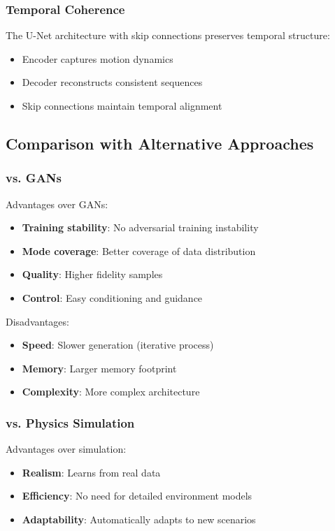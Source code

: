 \documentclass[journal]{IEEEtran}
\begin{document}
\subsubsection{Temporal Coherence}
The U-Net architecture with skip connections preserves temporal structure:
\begin{itemize}
\item Encoder captures motion dynamics
\item Decoder reconstructs consistent sequences
\item Skip connections maintain temporal alignment
\end{itemize}

\subsection{Comparison with Alternative Approaches}

\subsubsection{vs. GANs}
Advantages over GANs:
\begin{itemize}
\item \textbf{Training stability}: No adversarial training instability
\item \textbf{Mode coverage}: Better coverage of data distribution
\item \textbf{Quality}: Higher fidelity samples
\item \textbf{Control}: Easy conditioning and guidance
\end{itemize}

Disadvantages:
\begin{itemize}
\item \textbf{Speed}: Slower generation (iterative process)
\item \textbf{Memory}: Larger memory footprint
\item \textbf{Complexity}: More complex architecture
\end{itemize}

\subsubsection{vs. Physics Simulation}
Advantages over simulation:
\begin{itemize}
\item \textbf{Realism}: Learns from real data
\item \textbf{Efficiency}: No need for detailed environment models
\item \textbf{Adaptability}: Automatically adapts to new scenarios
\end{itemize}
\end{document}
